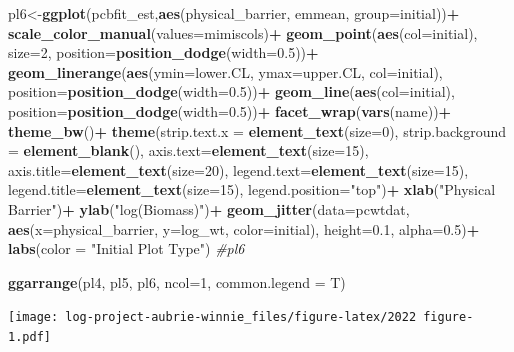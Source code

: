 \documentclass[
]{article}
\newenvironment{Shaded}{\begin{snugshade}}{\end{snugshade}}
\newcommand{\AttributeTok}[1]{\textcolor[rgb]{0.13,0.29,0.53}{#1}}
\newcommand{\CommentTok}[1]{\textcolor[rgb]{0.56,0.35,0.01}{\textit{#1}}}
\newcommand{\DecValTok}[1]{\textcolor[rgb]{0.00,0.00,0.81}{#1}}
\newcommand{\FloatTok}[1]{\textcolor[rgb]{0.00,0.00,0.81}{#1}}
\newcommand{\FunctionTok}[1]{\textcolor[rgb]{0.13,0.29,0.53}{\textbf{#1}}}
\newcommand{\NormalTok}[1]{#1}
\newcommand{\OtherTok}[1]{\textcolor[rgb]{0.56,0.35,0.01}{#1}}
\newcommand{\SpecialCharTok}[1]{\textcolor[rgb]{0.81,0.36,0.00}{\textbf{#1}}}
\newcommand{\StringTok}[1]{\textcolor[rgb]{0.31,0.60,0.02}{#1}}
\begin{document}
\begin{Shaded}
\begin{Highlighting}[]
\NormalTok{pl6}\OtherTok{\textless{}{-}}\FunctionTok{ggplot}\NormalTok{(pcbfit\_est,}\FunctionTok{aes}\NormalTok{(physical\_barrier, emmean, }\AttributeTok{group=}\NormalTok{initial))}\SpecialCharTok{+}
  \FunctionTok{scale\_color\_manual}\NormalTok{(}\AttributeTok{values=}\NormalTok{mimiscols)}\SpecialCharTok{+}
  \FunctionTok{geom\_point}\NormalTok{(}\FunctionTok{aes}\NormalTok{(}\AttributeTok{col=}\NormalTok{initial), }\AttributeTok{size=}\DecValTok{2}\NormalTok{, }\AttributeTok{position=}\FunctionTok{position\_dodge}\NormalTok{(}\AttributeTok{width=}\FloatTok{0.5}\NormalTok{))}\SpecialCharTok{+}
  \FunctionTok{geom\_linerange}\NormalTok{(}\FunctionTok{aes}\NormalTok{(}\AttributeTok{ymin=}\NormalTok{lower.CL, }\AttributeTok{ymax=}\NormalTok{upper.CL, }\AttributeTok{col=}\NormalTok{initial), }\AttributeTok{position=}\FunctionTok{position\_dodge}\NormalTok{(}\AttributeTok{width=}\FloatTok{0.5}\NormalTok{))}\SpecialCharTok{+}
  \FunctionTok{geom\_line}\NormalTok{(}\FunctionTok{aes}\NormalTok{(}\AttributeTok{col=}\NormalTok{initial), }\AttributeTok{position=}\FunctionTok{position\_dodge}\NormalTok{(}\AttributeTok{width=}\FloatTok{0.5}\NormalTok{))}\SpecialCharTok{+}
  \FunctionTok{facet\_wrap}\NormalTok{(}\FunctionTok{vars}\NormalTok{(name))}\SpecialCharTok{+}
  \FunctionTok{theme\_bw}\NormalTok{()}\SpecialCharTok{+}
  \FunctionTok{theme}\NormalTok{(}\AttributeTok{strip.text.x =} \FunctionTok{element\_text}\NormalTok{(}\AttributeTok{size=}\DecValTok{0}\NormalTok{),}
        \AttributeTok{strip.background =} \FunctionTok{element\_blank}\NormalTok{(),}
        \AttributeTok{axis.text=}\FunctionTok{element\_text}\NormalTok{(}\AttributeTok{size=}\DecValTok{15}\NormalTok{),}
        \AttributeTok{axis.title=}\FunctionTok{element\_text}\NormalTok{(}\AttributeTok{size=}\DecValTok{20}\NormalTok{),}
        \AttributeTok{legend.text=}\FunctionTok{element\_text}\NormalTok{(}\AttributeTok{size=}\DecValTok{15}\NormalTok{),}
        \AttributeTok{legend.title=}\FunctionTok{element\_text}\NormalTok{(}\AttributeTok{size=}\DecValTok{15}\NormalTok{),}
        \AttributeTok{legend.position=}\StringTok{"top"}\NormalTok{)}\SpecialCharTok{+}
  \FunctionTok{xlab}\NormalTok{(}\StringTok{"Physical Barrier"}\NormalTok{)}\SpecialCharTok{+}
  \FunctionTok{ylab}\NormalTok{(}\StringTok{"log(Biomass)"}\NormalTok{)}\SpecialCharTok{+}
  \FunctionTok{geom\_jitter}\NormalTok{(}\AttributeTok{data=}\NormalTok{pcwtdat,}
              \FunctionTok{aes}\NormalTok{(}\AttributeTok{x=}\NormalTok{physical\_barrier, }\AttributeTok{y=}\NormalTok{log\_wt, }\AttributeTok{color=}\NormalTok{initial), }
              \AttributeTok{height=}\FloatTok{0.1}\NormalTok{,}
              \AttributeTok{alpha=}\FloatTok{0.5}\NormalTok{)}\SpecialCharTok{+}
  \FunctionTok{labs}\NormalTok{(}\AttributeTok{color =} \StringTok{"Initial Plot Type"}\NormalTok{)}
\CommentTok{\#pl6}
\end{Highlighting}
\end{Shaded}

\begin{Shaded}
\begin{Highlighting}[]
\FunctionTok{ggarrange}\NormalTok{(pl4, pl5, pl6, }\AttributeTok{ncol=}\DecValTok{1}\NormalTok{, }\AttributeTok{common.legend =}\NormalTok{ T)}
\end{Highlighting}
\end{Shaded}

\texttt{[image: log-project-aubrie-winnie\_files/figure-latex/2022 figure-1.pdf]}
\end{document}
